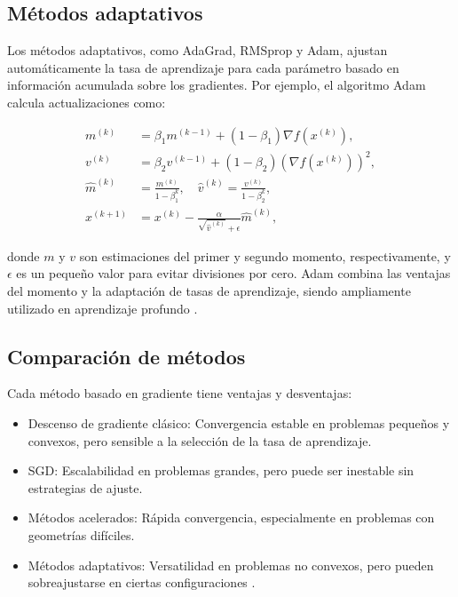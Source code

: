 \begin{itemize}
		\subsection{Métodos adaptativos}
		
		Los métodos adaptativos, como AdaGrad, RMSprop y Adam, ajustan automáticamente la tasa de aprendizaje para cada parámetro basado en información acumulada sobre los gradientes. Por ejemplo, el algoritmo Adam calcula actualizaciones como:
		
		\begin{align}
			m^{(k)} &= \beta_1 m^{(k-1)} + (1 - \beta_1) \nabla f(x^{(k)}), \\
			v^{(k)} &= \beta_2 v^{(k-1)} + (1 - \beta_2) (\nabla f(x^{(k)}))^2, \\
			\hat{m}^{(k)} &= \frac{m^{(k)}}{1 - \beta_1^k}, \quad \hat{v}^{(k)} = \frac{v^{(k)}}{1 - \beta_2^k}, \\
			x^{(k+1)} &= x^{(k)} - \frac{\alpha}{\sqrt{\hat{v}^{(k)}} + \epsilon} \hat{m}^{(k)},
		\end{align}
		
		donde \(m\) y \(v\) son estimaciones del primer y segundo momento, respectivamente, y \(\epsilon\) es un pequeño valor para evitar divisiones por cero. Adam combina las ventajas del momento y la adaptación de tasas de aprendizaje, siendo ampliamente utilizado en aprendizaje profundo \cite{kingma2014adam}.
		
		\subsection{Comparación de métodos}
		
		Cada método basado en gradiente tiene ventajas y desventajas:
		\begin{itemize}
			\item Descenso de gradiente clásico: Convergencia estable en problemas pequeños y convexos, pero sensible a la selección de la tasa de aprendizaje.
			\item SGD: Escalabilidad en problemas grandes, pero puede ser inestable sin estrategias de ajuste.
			\item Métodos acelerados: Rápida convergencia, especialmente en problemas con geometrías difíciles.
			\item Métodos adaptativos: Versatilidad en problemas no convexos, pero pueden sobreajustarse en ciertas configuraciones \cite{goodfellow2016deep}.
		\end{itemize}

\end{itemize}

